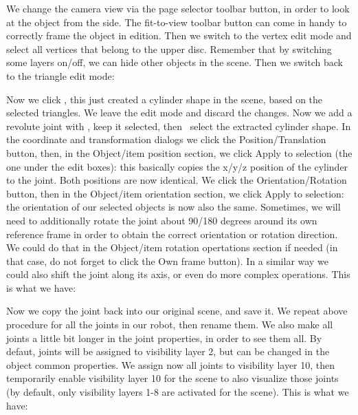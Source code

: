 
We change the camera view via the page selector toolbar button, in order to 
look at the object from the side. The fit-to-view toolbar button can come in 
handy to correctly frame the object in edition. Then we switch to the vertex
edit mode and select all vertices that belong to the upper disc. Remember that
by switching some layers on/off, we can hide other objects in the scene. Then
we switch back to the triangle edit mode:


Now we click , this just created a cylinder shape in the scene, based on the 
selected triangles. We leave the edit mode and discard the changes. Now we add
a revolute joint with , keep it selected, then 
\ select the extracted cylinder shape. In the coordinate and 
transformation dialogs we click the Position/Translation button, then, in the 
Object/item position section, we click Apply to selection (the one under the 
edit boxes): this basically copies the x/y/z position of the cylinder to the 
joint. Both positions are now identical. We click the Orientation/Rotation 
button, then in the Object/item orientation section, we click Apply to 
selection: the orientation of our selected objects is now also the same. 
Sometimes, we will need to additionally rotate the joint about 90/180 degrees
around its own reference frame in order to obtain the correct orientation or
rotation direction. We could do that in the Object/item rotation opertations 
section if needed (in that case, do not forget to click the Own frame button).
In a similar way we could also shift the joint along its axis, or even do more
complex operations. This is what we have:


Now we copy the joint back into our original scene, and save it. We repeat above 
procedure for all the joints in our robot, then rename them. We also make all 
joints a little bit longer in the joint properties, in order to see them all. 
By defaut, joints will be assigned to visibility layer 2, but can be changed
in the object common properties. We assign now all joints to visibility layer
10, then temporarily enable visibility layer 10 for the scene to also 
visualize those joints (by default, only visibility layers 1-8 are activated 
for the scene). This is what we have:

